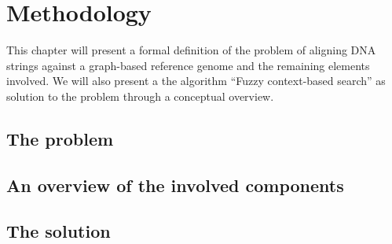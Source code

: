 \documentclass[thesis.tex]{subfiles}
\begin{document}
\chapter{Methodology}
This chapter will present a formal definition of the problem of aligning DNA strings against a graph-based reference genome and the remaining elements involved. We will also present a the algorithm ``Fuzzy context-based search'' as solution to the problem through a conceptual overview.
\section{The problem}
\section{An overview of the involved components}
\section{The solution}
\end{document}
